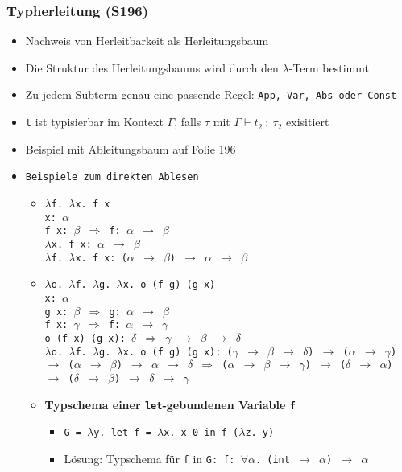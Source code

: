 \subsubsection{Typherleitung (S196)}
\begin{itemize}
	\item Nachweis von Herleitbarkeit als Herleitungsbaum
	\item Die Struktur des Herleitungsbaums wird durch den \(\lambda\)-Term bestimmt
	\item Zu jedem Subterm genau eine passende Regel: \texttt{App, Var, Abs oder Const}
	\item \texttt{t} ist typisierbar im Kontext \(\Gamma\), falls \(\tau\) mit \(\Gamma\vdash t_2~:~\tau_2\) exisitiert
	\item Beispiel mit Ableitungsbaum auf Folie 196
	\item \texttt{Beispiele zum direkten Ablesen}
	\begin{itemize}
		\item \texttt{\(\lambda\)f. \(\lambda\)x. f x \\ x: \(\alpha\) \\ f x: \(\beta\) \(\Rightarrow\) f: \(\alpha\) \(\rightarrow\) \(\beta\) \\ \(\lambda\)x. f x: \(\alpha\) \(\rightarrow\) \(\beta\) \\ \(\lambda\)f. \(\lambda\)x. f x: (\(\alpha\) \(\rightarrow\) \(\beta\)) \(\rightarrow\) \(\alpha\) \(\rightarrow\) \(\beta\)}
		\item \texttt{\(\lambda\)o. \(\lambda\)f. \(\lambda\)g. \(\lambda\)x. o (f g) (g x) \\ x: \(\alpha\) \\ g x: \(\beta\) \(\Rightarrow\) g: \(\alpha\) \(\rightarrow\) \(\beta\) \\ f x: \(\gamma\) \(\Rightarrow\) f: \(\alpha\) \(\rightarrow\) \(\gamma\) \\ o (f x) (g x): \(\delta\) \(\Rightarrow\) \(\gamma\) \(\rightarrow\) \(\beta\) \(\rightarrow\) \(\delta\) \\ \(\lambda\)o. \(\lambda\)f. \(\lambda\)g. \(\lambda\)x. o (f g) (g x): (\(\gamma\) \(\rightarrow\) \(\beta\) \(\rightarrow\) \(\delta\)) \(\rightarrow\) (\(\alpha\) \(\rightarrow\) \(\gamma\)) \(\rightarrow\) (\(\alpha\) \(\rightarrow\) \(\beta\)) \(\rightarrow\) \(\alpha\) \(\rightarrow\) \(\delta\) \(\Rightarrow\)  (\(\alpha\) \(\rightarrow\) \(\beta\) \(\rightarrow\) \(\gamma\)) \(\rightarrow\) (\(\delta\) \(\rightarrow\) \(\alpha\)) \(\rightarrow\) (\(\delta\) \(\rightarrow\) \(\beta\)) \(\rightarrow\) \(\delta\) \(\rightarrow\) \(\gamma\)}
		\item \textbf{Typschema einer \texttt{let}-gebundenen Variable \texttt{f}}
		\begin{itemize}
			\item \texttt{G = \(\lambda\)y. let f = \(\lambda\)x. x 0 in f (\(\lambda\)z. y)}
			\item Lösung: Typschema für \texttt{f} in \texttt{G: f: \(\forall\)\(\alpha\). (int \(\rightarrow\) \(\alpha\)) \(\rightarrow\) \(\alpha\)}
		\end{itemize}
	\end{itemize}
\end{itemize}

